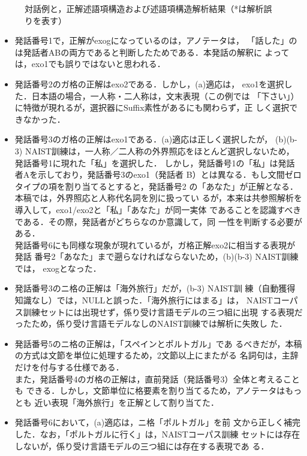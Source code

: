\documentclass[japanese]{jnlp_1.4}
\begin{document}
\begin{figure}[p]

\caption{対話例と，正解述語項構造および述語項構造解析結果（*は解析誤りを表す）}
\label{fig-analysis-example}
\end{figure}

\begin{itemize}
\item 発話番号1で，正解がexogになっているのは，アノテータは，
「話した」のは発話者ABの両方であると判断したためである．本発話の解釈に
よっては，exo1でも誤りではないと思われる．
\item 発話番号2のガ格の正解はexo2である．しかし，(a)適応は，
exo1を選択した．日本語の場合，一人称・二人称は，文末表現（この例では
「下さい」）に特徴が現れるが，選択器にSuffix素性があるにも関わらず，正
しく選択できなかった．
\item 発話番号3のガ格の正解はexo1である．(a)適応は正しく選択したが，
(b)(b-3) NAIST訓練は，一人称／二人称の外界照応をほとんど選択しないため，
発話番号1に現れた「私」を選択した．
しかし，発話番号1の「私」は発話者Aを示しており，発話番号3のexo1（発話者
  B）とは異なる．もし文間ゼロタイプの項を割り当てるとすると，発話番号2
の「あなた」が正解となる．本稿では，外界照応と人称代名詞を別に扱ってい
るが，本来は共参照解析を導入して，exo1/exo2と「私」「あなた」が同一実体
であることを認識すべきである．その際，発話者がどちらなのか意識して，同
一性を判断する必要がある．\\
発話番号6にも同様な現象が現れているが，ガ格正解exo2に相当する表現が発話
番号2「あなた」まで遡らなければならないため，(b)(b-3) NAIST訓練では，
exogとなった．
\item 発話番号3のニ格の正解は「海外旅行」だが，(b-3) NAIST訓
練（自動獲得知識なし）では，NULLと誤った．「海外旅行にはまる」は，
NAISTコーパス訓練セットには出現せず，係り受け言語モデルの三つ組に出現
する表現だったため，係り受け言語モデルなしのNAIST訓練では解析に失敗し
た．
\item 発話番号5のニ格の正解は，「スペインとポルトガル」であ
るべきだが，本稿の方式は文節を単位に処理するため，2文節以上にまたがる
名詞句は，主辞だけを付与する仕様である．\\
また，発話番号4のガ格の正解は，直前発話（発話番号3）全体と考えることも
できる．しかし，文節単位に格要素を割り当てるため，アノテータはもっとも
近い表現「海外旅行」を正解として割り当てた．
\item 発話番号6において，(a)適応は，ニ格「ポルトガル」を前
文から正しく補完した．なお，「ポルトガルに行く」は，NAISTコーパス訓練
セットには存在しないが，係り受け言語モデルの三つ組には存在する表現であ
る．
\end{itemize}
\end{document}
